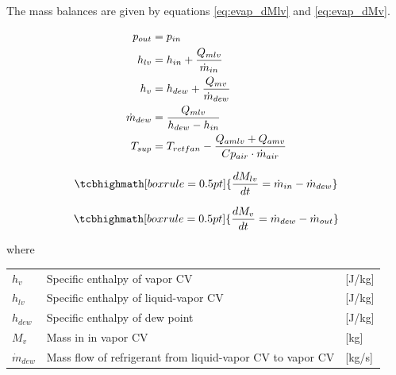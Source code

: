 The mass balances are given by equations \cref{eq:evap_dMlv} and \cref{eq:evap_dMv}.

\begin{align}
	p_{out}       & = p_{in} \label{eq:evap_pout}                                                                \\
	h_{lv}        & = h_{in} + \frac{Q_{mlv}}{\dot{m}_{in}} \label{eq:evap_hlv}                                  \\
	h_v           & = h_{dew} + \frac{Q_{mv}}{\dot{m}_{dew}} \label{eq:evap_hv}                                  \\
	\dot{m}_{dew} & = \frac{Q_{mlv}}{h_{dew} - h_{in}} \label{eq:evap_mdot_{lv}}                                 \\
	T_{sup}       & = T_{retfan} -  \frac{Q_{amlv} + Q_{amv}}{Cp_{air} \cdot \dot{m}_{air}} \label{eq:evap_Tsup}
\end{align}

\begin{equation} \label{eq:evap_dMlv}
	\tcbhighmath[boxrule = 0.5pt]{\frac{dM_{lv}}{dt} = \dot{m}_{in} - \dot{m}_{dew}  }
\end{equation}

\begin{equation} \label{eq:evap_dMv}
	\tcbhighmath[boxrule = 0.5pt]{\frac{dM_v}{dt}   = \dot{m}_{dew} - \dot{m}_{out}  }
\end{equation}

\smallskip

where

\begin{center}
	\begin{tabular}{l p{10cm} l}
		$h_{v}$         & Specific enthalpy of vapor CV                                            & [\si{J}/\si{kg}]                  \\
		$h_{lv}$        & Specific enthalpy of liquid-vapor CV                                     & [\si{J}/\si{kg}]                  \\
		$h_{dew}$        & Specific enthalpy of dew point                                           & [\si{J}/\si{kg}]                  \\
		$M_{v}$          & Mass in	in vapor CV                                                      & [\si{kg}]                  \\
		$\dot{m}_{dew}$ & Mass flow of refrigerant from liquid-vapor CV to vapor CV                & [\si{kg}/\si{s}]                  \\
	\end{tabular}
\end{center}

